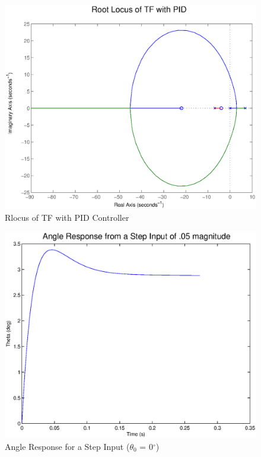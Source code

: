 \documentclass{article}
\begin{document}
\begin{figure}[!htb]
    \centering
    \includegraphics[scale=0.6]{1}
    \caption{ Rlocus of TF with PID Controller}
\end{figure} 

\begin{figure}[!htb]
    \centering
    \includegraphics[scale=0.6]{2}
    \caption{Angle Response for a Step Input ($\theta_0$ = 0$^{\circ}$)}
\end{figure} 
\end{document}
